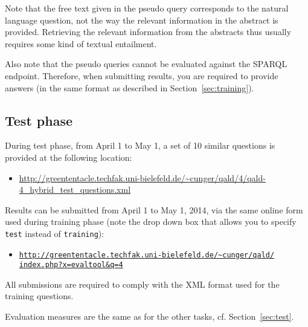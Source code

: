 Note that the free text given in the pseudo query corresponds to the natural language question, 
not the way the relevant information in the abstract is provided. Retrieving the relevant information  
from the abstracts thus usually requires some kind of textual entailment.

Also note that the pseudo queries cannot be evaluated against the SPARQL endpoint. 
Therefore, when submitting results, you are required to provide answers (in the same format as described in Section~\ref{sec:training}).


\subsection{Test phase}

During test phase, from April 1 to May 1, a set of 10 similar questions is provided at the following location:
\begin{itemize} 
\item[] \url{http://greententacle.techfak.uni-bielefeld.de/~cunger/qald/4/qald-4_hybrid_test_questions.xml} 
\end{itemize} 

Results can be submitted from April 1 to May 1, 2014, via the same online form used during training phase 
(note the drop down box that allows you to specify {\tt test} instead of {\tt training}):

\begin{itemize}
\item[] \href{http://greententacle.techfak.uni-bielefeld.de/~cunger/qald/index.php?x=evaltool&q=4}{\texttt{http://greententacle.techfak.uni-bielefeld.de/\textasciitilde cunger/qald/\\index.php?x=evaltool\&q=4}}
\end{itemize}

All submissions are required to comply with the XML format used for the training questions. 

Evaluation measures are the same as for the other tasks, cf. Section~\ref{sec:test}.
